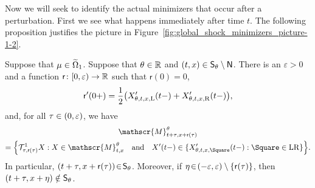 \documentclass[AHL,Unicode,longabstracts]{cedram}
\newcommand*\ssS{\mathsf{S}}
\newcommand*\ssN{\mathsf{N}}
\newcommand*\sfr{\mathsf{r}}
\newcommand*\scM{\mathscr{M}}
\newcommand*\RR{\mathbb{R}}
\newcommand{\clT}{\mathcal{T}}
\newcommand*\st{\mathrel{:}}
\newcommand*\Left{\mathrm{L}}
\newcommand*\Right{\mathrm{R}}
\newcommand*\LR{\mathrm{LR}}
\newcommand*\eps{\varepsilon}
\renewcommand*{\to}{\mathchoice{\longrightarrow}{\rightarrow}{\rightarrow}{\rightarrow}}
\let\oldin\in
\renewcommand{\in}{\mathchoice{\oldin}{\oldin}{\,\oldin\,}{\,\oldin\,}}
\let\originalleft\left
\let\originalright\right
\renewcommand{\left}{\mathopen{}\mathclose\bgroup\originalleft}
\renewcommand{\right}{\aftergroup\egroup\originalright}
\newcommand*\RR{\mathbb{R}}
\begin{document}
Now we will seek to identify the actual minimizers that occur after a perturbation. First we see what happens immediately after time $t$. The following proposition justifies the picture in Figure~\ref{fig:global_shock_minimizers_picture-1-2}.

\begin{prop}\label{prop:advanceint}
Suppose that $\mu\in\widetilde{\Omega}_{1}$. Suppose that $\theta\in\RR$ and $(t,x)\in\ssS_{\theta}\setminus\ssN$. There is an $\eps>0$ and a function $\sfr\colon[0,\eps)\to\RR$ such that $\sfr(0)=0$,
\begin{equation}\label{eq:advanceint-rderiv}
\sfr'(0+)=\frac{1}{2}\left(X_{\theta,t,x,\Left}'(t-)+X_{\theta,t,x,\Right}'(t-)\right),
\end{equation}
and, for all $\tau\in(0,\eps)$, we have
\begin{multline}\label{eq:usesameminimum}
\scM_{t+\tau,x+\sfr(\tau)}^{\theta}\\
=\left\{\clT_{\tau,\sfr(\tau)}^{1}X\st X\in\scM_{t,x}^{\theta}\quad\text{and}\quad X'(t-)\in\{X_{\theta,t,x,\Square}'(t-)\st\Square\in\LR\}\right\}.
\end{multline}
In particular, $(t+\tau,x+\sfr(\tau))\!\in\!\ssS_{\theta}$. Moreover, if $\eta\!\in\!(-\eps,\eps)\setminus\{\sfr(\tau)\}$, then $(t+\tau,x+\eta)\linebreak\notin\ssS_{\theta}$.
\end{prop}
\end{document}
